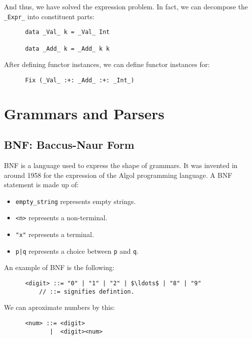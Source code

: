 \documentclass[a4paper,12pt]{article}
\theoremstyle{remark}
\begin{document}
  And thus, we have solved the expression problem. In fact, we can decompose the \lstinline{_Expr_}
  into constituent parts:

  \begin{lstlisting}
      data _Val_ k = _Val_ Int

      data _Add_ k = _Add_ k k  \end{lstlisting}

  After defining functor instances, we can define functor instances for:

  \begin{lstlisting}
      Fix (_Val_ :+: _Add_ :+: _Int_)  \end{lstlisting}

  \section{Grammars and Parsers}

  \subsection{BNF: Baccus-Naur Form}

  BNF is a language used to express the shape of grammars. It was invented in around
  1958 for the expression of the Algol programming language. A BNF statement is made
  up of:

  \begin{itemize}
    \item \lstinline{empty_string} represents empty strings.
    \item \lstinline{<n>} represents a non-terminal.
    \item \lstinline{"x"} represents a terminal.
    \item \lstinline{p|q} represents a choice between \lstinline{p} and \lstinline{q}.
  \end{itemize}

  An example of BNF is the following:

  \begin{lstlisting}
      <digit> ::= "0" | "1" | "2" | $\ldots$ | "8" | "9"
          // ::= signifies defintion.  \end{lstlisting}

  We can aproximate numbers by this:

  \begin{lstlisting}
      <num> ::= <digit>
             |  <digit><num>  \end{lstlisting}
\end{document}
